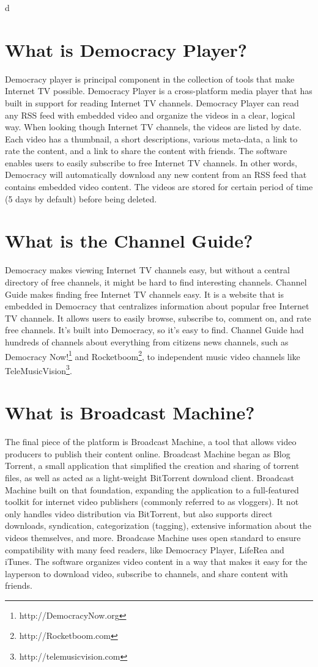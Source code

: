 d\documentclass[a4paper,12pt]{report}
\begin{document}
\section{What is Democracy Player?}
Democracy player is principal component in the collection of tools that make Internet TV possible.
Democracy Player is a cross-platform media player that has built in support for reading Internet TV channels.
Democracy Player can read any RSS feed with embedded video and organize the videos in a clear, logical way.
When looking though Internet TV channels, the videos are listed by date. Each video has a thumbnail, a short descriptions, various meta-data, a link to rate the content, and a link to share the content with friends.
The software enables users to easily subscribe to free Internet TV channels.
In other words, Democracy will automatically download any new content from an RSS feed that contains embedded video content.
The videos are stored for certain period of time (5 days by default) before being deleted.

\section {What is the Channel Guide?}
Democracy makes viewing Internet TV channels easy, but without a central directory of free channels, it might be hard to find interesting channels.
Channel Guide makes finding free Internet TV channels easy.
It is a website that is embedded in Democracy that centralizes information about popular free Internet TV channels.
It allows users to easily browse, subscribe to, comment on, and rate free channels.
It's built into Democracy, so it's easy to find.
Channel Guide had hundreds of channels about everything from citizens news channels, such as Democracy Now!\footnote {http://DemocracyNow.org} and Rocketboom\footnote {http://Rocketboom.com}, to independent music video channels like TeleMusicVision\footnote{http://telemusicvision.com}.

\section{What is Broadcast Machine?}
	The final piece of the platform is Broadcast Machine, a tool that allows video producers to publish their content online.
	Broadcast Machine began as Blog Torrent, a small application that simplified the creation and sharing of torrent files, as well as acted as a light-weight BitTorrent download client. 
Broadcast Machine built on that foundation, expanding the application to a full-featured toolkit for internet video publishers (commonly referred to as vloggers).
It not only handles video distribution via BitTorrent, but also supports direct downloads, syndication, categorization (tagging), extensive information about the videos themselves, and more.
Broadcase Machine uses open standard to ensure compatibility with many feed readers, like Democracy Player, LifeRea and iTunes.
The software organizes video content in a way that makes it easy for the layperson to download video, subscribe to channels, and share content with friends.
\end{document}
